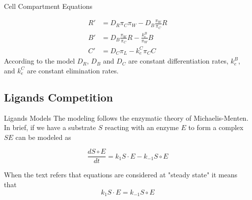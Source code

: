 \documentclass{beamer}
\begin{document}
\begin{frame}{Cell Compartment Equations}

\begin{equation}
	\begin{split}
	R' &= D_R \pi_C \pi_W - D_B \frac{\pi_W}{\pi_C} R\\
	B' &= D_B \frac{\pi_W}{\pi_C} R - \frac{k_e^B}{\pi_W}B\\
	C' &= D_C \pi_L - k_e^C \pi_C C 
	\end{split}
\end{equation}
According to the model $D_R$, $D_B$ and $D_C$ are constant differentiation rates, $k_e^B$, and $k_e^C$ are constant elimination rates. 

\end{frame}

\subsection{Ligands Competition}
\begin{frame}{Ligands Models}
	The modeling follows the enzymatic theory of Michaelis-Menten.
	In brief, if we have a substrate $S$ reacting with an enzyme $E$ to form a complex $SE$ can be modeled as
\begin{center}
\end{center}	

\begin{equation}
\frac{d S \circ E}{dt}= k_1 S \cdot E - k_{-1} S \circ E
\end{equation}

When the text refers that equations are considered at "steady state" it means that 
\begin{equation*}
	k_1 S \cdot E = k_{-1} S \circ E
\end{equation*}
	
\end{frame}
\end{document}

